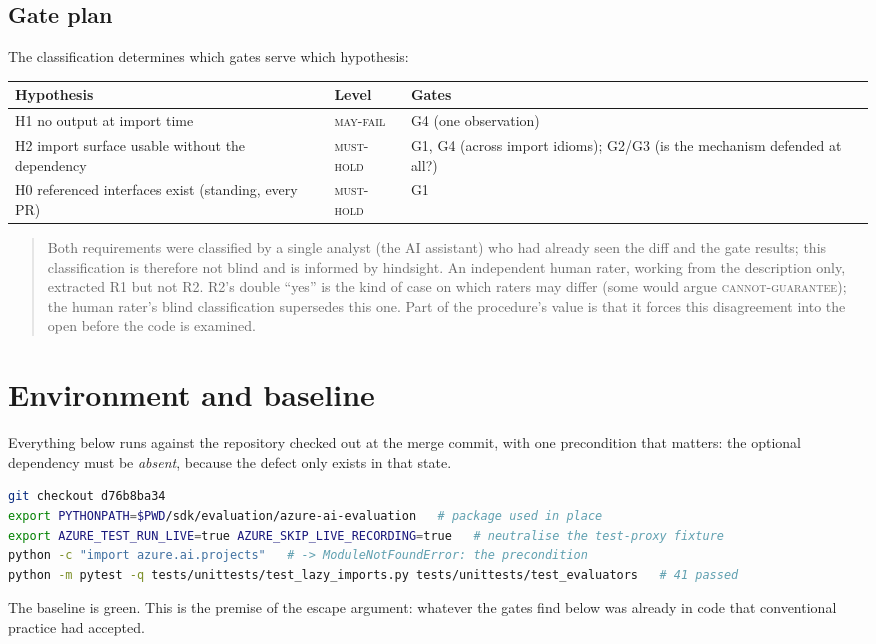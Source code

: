 \documentclass[11pt,a4paper]{article}
\newcommand{\musthold}{\textsc{must-hold}}
\newcommand{\mayfail}{\textsc{may-fail}}
\newcommand{\cannot}{\textsc{cannot-guarantee}}
\newcommand{\note}[1]{\begin{quote}\small\color{black!70}#1\end{quote}}
\begin{document}
\subsection{Gate plan}
The classification determines which gates serve which hypothesis:
\begin{center}\small
\begin{tabularx}{\textwidth}{X l X}
\toprule
Hypothesis & Level & Gates \\
\midrule
H1 no output at import time & \mayfail & G4 (one observation) \\
H2 import surface usable without the dependency & \musthold & G1, G4 (across import idioms); G2/G3 (is the mechanism defended at all?) \\
H0 referenced interfaces exist (standing, every PR) & \musthold & G1 \\
\bottomrule
\end{tabularx}
\end{center}

\note{Both requirements were classified by a single analyst (the AI assistant) who had already seen the diff and the gate results; this classification is therefore not blind and is informed by hindsight. An independent human rater, working from the description only, extracted R1 but not R2. R2's double ``yes'' is the kind of case on which raters may differ (some would argue \cannot); the human rater's blind classification supersedes this one. Part of the procedure's value is that it forces this disagreement into the open before the code is examined.}

\section{Environment and baseline}
Everything below runs against the repository checked out at the merge commit, with one precondition that matters: the optional dependency must be \emph{absent}, because the defect only exists in that state.
\begin{lstlisting}[language=bash]
git checkout d76b8ba34
export PYTHONPATH=$PWD/sdk/evaluation/azure-ai-evaluation   # package used in place
export AZURE_TEST_RUN_LIVE=true AZURE_SKIP_LIVE_RECORDING=true   # neutralise the test-proxy fixture
python -c "import azure.ai.projects"   # -> ModuleNotFoundError: the precondition
python -m pytest -q tests/unittests/test_lazy_imports.py tests/unittests/test_evaluators   # 41 passed
\end{lstlisting}
The baseline is green. This is the premise of the escape argument: whatever the gates find below was already in code that conventional practice had accepted.
\end{document}
